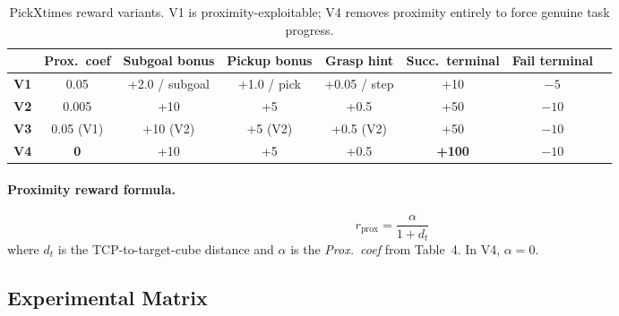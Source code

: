 \documentclass[11pt,letterpaper]{article}
\begin{document}
\begin{table}[H]
\centering
\renewcommand{\arraystretch}{1.2}
\begin{tabular}{lccccccc}
\toprule
& \textbf{Prox.\ coef} & \textbf{Subgoal bonus} & \textbf{Pickup bonus}
& \textbf{Grasp hint} & \textbf{Succ.\ terminal} & \textbf{Fail terminal} \\
\midrule
\textbf{V1} & 0.05 & +2.0 / subgoal & +1.0 / pick & +0.05 / step & +10 & $-5$ \\
\textbf{V2} & 0.005 & +10 & +5 & +0.5 & +50 & $-10$ \\
\textbf{V3} & 0.05 (V1) & +10 (V2) & +5 (V2) & +0.5 (V2) & +50 & $-10$ \\
\textbf{V4} & \textbf{0} & +10 & +5 & +0.5 & \textbf{+100} & $-10$ \\
\bottomrule
\end{tabular}
\caption{PickXtimes reward variants. V1 is proximity-exploitable; V4 removes
proximity entirely to force genuine task progress.}
\end{table}

\paragraph{Proximity reward formula.}
\[
r_\text{prox} = \frac{\alpha}{1 + d_t}
\]
where $d_t$ is the TCP-to-target-cube distance and $\alpha$ is the
\emph{Prox.\ coef} from Table~4. In V4, $\alpha = 0$.

\subsection{Experimental Matrix}
\end{document}
